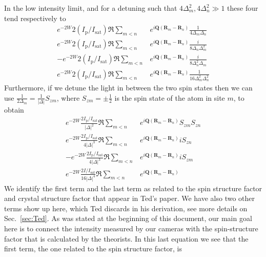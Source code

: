 \documentclass[11pt,letter]{article}
\newcommand{\bv}[1]{\ensuremath{\bm{#1}}}
\begin{document}
In the low intensity limit, and for a detuning such that $4\Delta_{m}^{2}, 4\Delta_{n}^{2} \gg 1 $ these four tend respectively to 
\begin{align} 
    e^{-2W} 2(I_{\mathrm{p}}/I_{\mathrm{sat}}) \Re \sum_{m<n} & 
      e^{ i \bv{Q}( \bv{R}_{m} - \bv{R}_{n} ) } 
      \frac{1}{ 4 \Delta_{m} \Delta_{n} }  \\
    e^{-2W} 2(I_{\mathrm{p}}/I_{\mathrm{sat}}) \Re \sum_{m<n} & 
      e^{ i \bv{Q}( \bv{R}_{m} - \bv{R}_{n} ) } 
      \frac{i}{ 8 \Delta_{n} \Delta_{m}^{2}} \\
  - e^{-2W} 2(I_{\mathrm{p}}/I_{\mathrm{sat}}) \Re \sum_{m<n} & 
      e^{ i \bv{Q}( \bv{R}_{m} - \bv{R}_{n} ) } 
      \frac{i}{ 8 \Delta_{n}^{2} \Delta_{m} } \\
    e^{-2W} 2(I_{\mathrm{p}}/I_{\mathrm{sat}}) \Re \sum_{m<n} & 
      e^{ i \bv{Q}( \bv{R}_{m} - \bv{R}_{n} ) } 
      \frac{1}{ 16 \Delta_{m}^{2} \Delta_{n}^{2} }
\end{align}
Furthermore, if we detune the light in between the two spin states then we can
use $\frac{1}{2\Delta_{m}} = \frac{1}{|\Delta|}S_{zm}$, where
$S_{zm}=\pm\frac{1}{2}$ is the spin state of the atom in site $m$, to obtain
\begin{align} 
    e^{-2W} \frac{2I_{\mathrm{p}}/I_{\mathrm{sat}}}{ |\Delta|^{2} }  \Re \sum_{m<n} & 
      e^{ i \bv{Q}( \bv{R}_{m} - \bv{R}_{n} ) } 
      S_{zm}S_{zn}  \\
    e^{-2W} \frac{2I_{\mathrm{p}}/I_{\mathrm{sat}}}{ 4 |\Delta|^{3} }  \Re \sum_{m<n} & 
      e^{ i \bv{Q}( \bv{R}_{m} - \bv{R}_{n} ) } 
       i S_{zn} \\
  - e^{-2W} \frac{2I_{\mathrm{p}}/I_{\mathrm{sat}}}{ 4 |\Delta|^{3} }  \Re \sum_{m<n} & 
      e^{ i \bv{Q}( \bv{R}_{m} - \bv{R}_{n} ) }
       i S_{zm} \\  
    e^{-2W} \frac{2I/I_{\mathrm{sat}}}{ 16 |\Delta|^{4} }  \Re \sum_{m<n} & 
      e^{ i \bv{Q}( \bv{R}_{m} - \bv{R}_{n} ) } 
\end{align}
We identify the first term and the last term as related to the spin structure factor and crystal structure factor that appear in Ted's
paper.   We have also two other terms show up here, which Ted discards in his
derivation, see more details on Sec.~\ref{sec:Ted}.    As was stated at the
beginning of this document, our main goal here is to connect the intensity
measured by our cameras with the spin-structure factor that is calculated by the
theorists.   In this last equation we see that the first term, the one related to the spin structure factor, is
\end{document}
